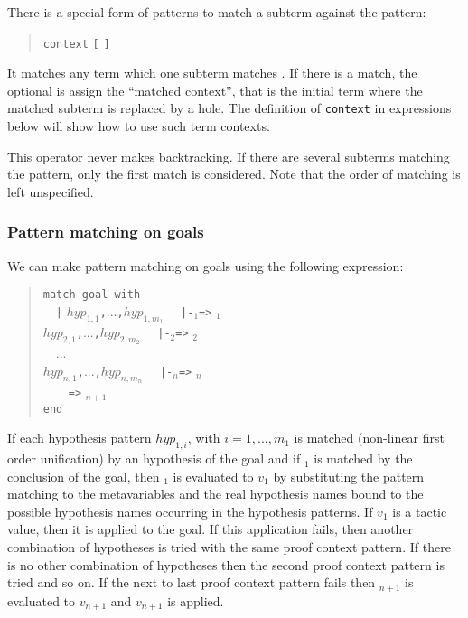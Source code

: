 There is a special form of patterns to match a subterm against the
pattern:
\begin{quote}
{\tt context} {\ident} {\tt [} {\cpattern} {\tt ]}
\end{quote}
It matches any term which one subterm matches {\cpattern}. If there is
a match, the optional {\ident} is assign the ``matched context'', that
is the initial term where the matched subterm is replaced by a
hole. The definition of {\tt context} in expressions below will show
how to use such term contexts.

This operator never makes backtracking. If there are several subterms
matching the pattern, only the first match is considered. Note that
the order of matching is left unspecified.


\subsubsection{Pattern matching on goals}

We can make pattern matching on goals using the following expression:
\begin{quote}
\begin{tabbing}
{\tt match goal with}\\
~~\={\tt |} $hyp_{1,1}${\tt ,}...{\tt ,}$hyp_{1,m_1}$
   ~~{\tt |-}{\cpattern}$_1${\tt =>} {\tacexpr}$_1$\\
  \>{\tt |} $hyp_{2,1}${\tt ,}...{\tt ,}$hyp_{2,m_2}$
   ~~{\tt |-}{\cpattern}$_2${\tt =>} {\tacexpr}$_2$\\
~~...\\
  \>{\tt |} $hyp_{n,1}${\tt ,}...{\tt ,}$hyp_{n,m_n}$
   ~~{\tt |-}{\cpattern}$_n${\tt =>} {\tacexpr}$_n$\\
  \>{\tt |\_}~~~~{\tt =>} {\tacexpr}$_{n+1}$\\
{\tt end}
\end{tabbing}
\end{quote}


If each hypothesis pattern $hyp_{1,i}$, with $i=1,...,m_1$
is matched (non-linear first order unification) by an hypothesis of
the goal and if {\cpattern}$_1$ is matched by the conclusion of the
goal, then {\tacexpr}$_1$ is evaluated to $v_1$ by substituting the
pattern matching to the metavariables and the real hypothesis names
bound to the possible hypothesis names occurring in the hypothesis
patterns. If $v_1$ is a tactic value, then it is applied to the
goal. If this application fails, then another combination of
hypotheses is tried with the same proof context pattern. If there is
no other combination of hypotheses then the second proof context
pattern is tried and so on. If the next to last proof context pattern
fails then {\tacexpr}$_{n+1}$ is evaluated to $v_{n+1}$ and $v_{n+1}$
is applied.

